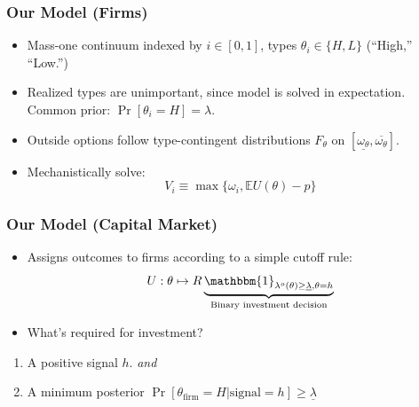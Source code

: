 \documentclass{beamer}
\begin{document}
\begin{frame}
    \frametitle{Our Model (Firms)}
    \begin{itemize}[<+>]
        \item Mass-one continuum indexed by $i \in [0, 1]$, types $\theta_i \in \{H, L\}$ (``High,'' ``Low.'')
        \item Realized types are unimportant, since model is solved in expectation. Common prior: $\Pr[\theta_i = H] = \lambda$. 
        \item Outside options follow type-contingent distributions $F_\theta$ on $[\underline{\omega_\theta}, \overline{\omega_\theta}]$. 
        \item Mechanistically solve: 
        \begin{equation}
            V_i \equiv \max \{\omega_i, \mathbb{E} U(\theta) - p \}
            \label{firm-objective}
        \end{equation}
    \end{itemize}
\end{frame}

\begin{frame}
    \frametitle{Our Model (Capital Market)}
    \begin{itemize}[<+>]
        \item Assigns outcomes to firms according to a simple cutoff rule: 
        \begin{equation}
            U: \theta \mapsto R \underbrace{\mathbbm{1}_{\lambda^o(\theta) \geq \underline{\lambda}, \theta = h}}_{\text{Binary investment decision}}    
            \label{market-objective}
        \end{equation}
        \item What's required for investment? 
    \end{itemize} \pause
    \begin{enumerate}
        \item A positive signal $h$. \emph{and}
        \item A minimum posterior $\Pr[\theta_\text{firm} = H | \text{signal} = h] \geq \underline{\lambda}$ 
    \end{enumerate}
\end{frame}
\end{document}
